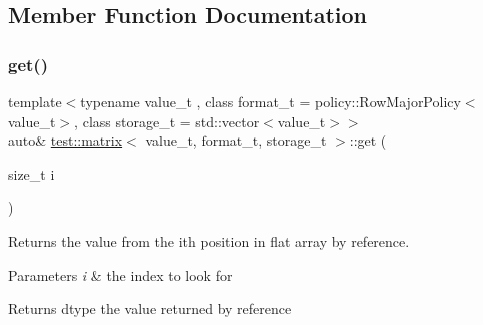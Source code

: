 \subsection{Member Function Documentation}
\mbox{\label{classtest_1_1matrix_ae97c6a005660b4a3b3d231d913527a9e}} 
\subsubsection{\texorpdfstring{get()}{get()}\hspace{0.1cm}{\footnotesize\ttfamily [1/4]}}
{\footnotesize\ttfamily template$<$typename value\+\_\+t , class format\+\_\+t  = policy\+::\+Row\+Major\+Policy$<$value\+\_\+t$>$, class storage\+\_\+t  = std\+::vector$<$value\+\_\+t$>$$>$ \\
auto\& \mbox{\hyperlink{classtest_1_1matrix}{test\+::matrix}}$<$ value\+\_\+t, format\+\_\+t, storage\+\_\+t $>$\+::get (\begin{DoxyParamCaption}\item[{size\+\_\+t}]{i }\end{DoxyParamCaption})\hspace{0.3cm}{\ttfamily [inline]}}



Returns the value from the ith position in flat array by reference. 


\begin{DoxyParams}{Parameters}
{\em i} & the index to look for \\
\hline
\end{DoxyParams}
\begin{DoxyReturn}{Returns}
dtype the value returned by reference 
\end{DoxyReturn}
\mbox{\label{classtest_1_1matrix_a30b5e83cc4d03d78c9df3b9aea4808fd}} 

